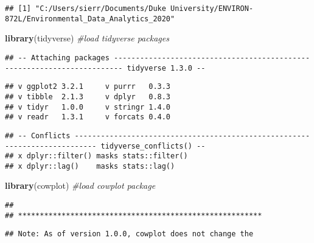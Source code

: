 \documentclass[
]{article}
\newenvironment{Shaded}{\begin{snugshade}}{\end{snugshade}}
\newcommand{\CommentTok}[1]{\textcolor[rgb]{0.56,0.35,0.01}{\textit{#1}}}
\newcommand{\KeywordTok}[1]{\textcolor[rgb]{0.13,0.29,0.53}{\textbf{#1}}}
\newcommand{\NormalTok}[1]{#1}
\begin{document}
\begin{Shaded}
\end{Shaded}

\begin{verbatim}
## [1] "C:/Users/sierr/Documents/Duke University/ENVIRON-872L/Environmental_Data_Analytics_2020"
\end{verbatim}

\begin{Shaded}
\begin{Highlighting}[]
\KeywordTok{library}\NormalTok{(tidyverse) }\CommentTok{#load tidyverse packages}
\end{Highlighting}
\end{Shaded}

\begin{verbatim}
## -- Attaching packages ------------------------------------------------------------------------ tidyverse 1.3.0 --
\end{verbatim}

\begin{verbatim}
## v ggplot2 3.2.1     v purrr   0.3.3
## v tibble  2.1.3     v dplyr   0.8.3
## v tidyr   1.0.0     v stringr 1.4.0
## v readr   1.3.1     v forcats 0.4.0
\end{verbatim}

\begin{verbatim}
## -- Conflicts --------------------------------------------------------------------------- tidyverse_conflicts() --
## x dplyr::filter() masks stats::filter()
## x dplyr::lag()    masks stats::lag()
\end{verbatim}

\begin{Shaded}
\begin{Highlighting}[]
\KeywordTok{library}\NormalTok{(cowplot) }\CommentTok{#load cowplot package}
\end{Highlighting}
\end{Shaded}

\begin{verbatim}
## 
## ********************************************************
\end{verbatim}

\begin{verbatim}
## Note: As of version 1.0.0, cowplot does not change the
\end{verbatim}
\end{document}
